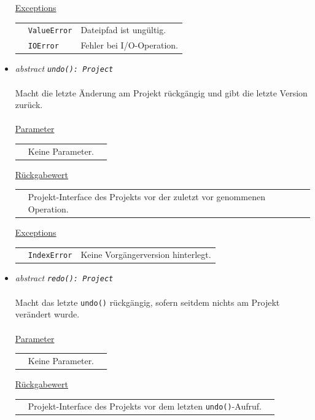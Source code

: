 \documentclass{article}
\begin{document}
\begin{itemize}
\underline{Exceptions}\\
\begin{tabular}{lll}
 & \texttt{ValueError} & Dateipfad ist ungültig.\\
 & \texttt{IOError} & Fehler bei I/O-Operation.\\
\end{tabular}


\item \textit{\flqq{}abstract\frqq} \texttt{\textit{undo(): Project}}\\\\
Macht die letzte Änderung am Projekt rückgängig und gibt die letzte Version zurück.
\\\\
\underline{Parameter}\\
\begin{tabular}{lll}
 & Keine Parameter.
\end{tabular}

\underline{Rückgabewert}\\
\begin{tabular}{lll}
 & Projekt-Interface des Projekts vor der zuletzt vor genommenen Operation.\\
\end{tabular}

\underline{Exceptions}\\
\begin{tabular}{lll}
 & \texttt{IndexError} & Keine Vorgängerversion hinterlegt.\\
\end{tabular}


\item \textit{\flqq{}abstract\frqq} \texttt{\textit{redo(): Project}}\\\\
Macht das letzte \texttt{undo()} rückgängig, sofern seitdem nichts am Projekt verändert wurde.
\\\\
\underline{Parameter}\\
\begin{tabular}{lll}
 & Keine Parameter.
\end{tabular}

\underline{Rückgabewert}\\
\begin{tabular}{lll}
 & Projekt-Interface des Projekts vor dem letzten \texttt{undo()}-Aufruf.\\
\end{tabular}


\end{itemize}
\end{document}
